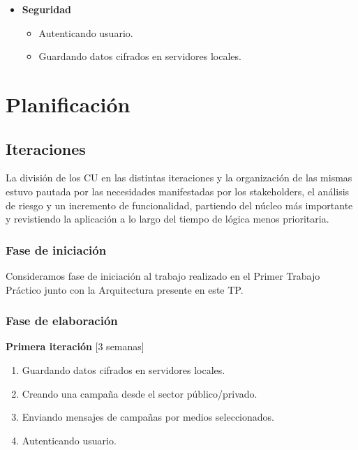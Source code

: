 \documentclass[a4paper, 10pt, twoside]{article}
\begin{document}
\begin{itemize}
\item \textbf{Seguridad}
\begin{itemize}
\item Autenticando usuario.
\item Guardando datos cifrados en servidores locales.
\end{itemize}
\end{itemize}

\newpage


\section{Planificación}

\subsection{Iteraciones}
La división de los CU en las distintas iteraciones y la organización de las mismas estuvo pautada por las necesidades manifestadas por los stakeholders, el análisis de riesgo y un incremento de funcionalidad, partiendo del núcleo más importante y revistiendo la aplicación a lo largo del tiempo de lógica menos prioritaria.

\subsubsection{Fase de iniciación}
Consideramos fase de iniciación al trabajo realizado en el Primer Trabajo Práctico junto con la Arquitectura presente en este TP.

\subsubsection{Fase de elaboración}

\textbf{Primera iteración} [3 semanas]
\begin{enumerate}
\item Guardando datos cifrados en servidores locales.
\item Creando una campaña desde el sector público/privado.
\item Enviando mensajes de campañas por medios seleccionados.
\item Autenticando usuario.
\end{enumerate}
\end{document}
